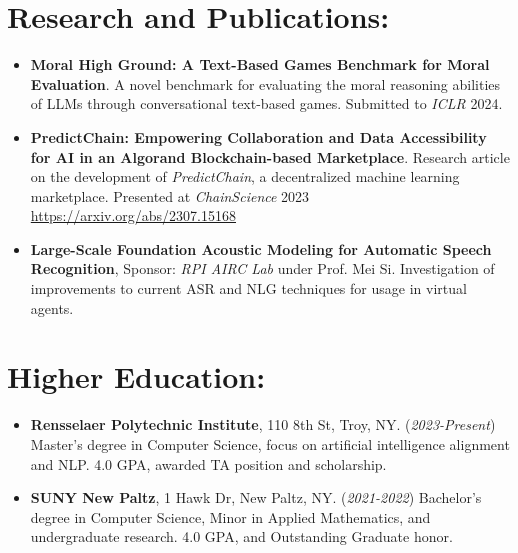 \documentclass[12pt]{article}
\begin{document}
\section*{Research and Publications:}
\begin{itemize}
    \itemsep0em
    
    \item \textbf{Moral High Ground: A Text-Based Games Benchmark for Moral Evaluation}.  A novel benchmark for evaluating the moral reasoning abilities of LLMs through conversational text-based games.  Submitted to \textit{ICLR} 2024.
    
    \item \textbf{PredictChain: Empowering Collaboration and Data Accessibility for AI in an Algorand Blockchain-based Marketplace}.  Research article on the development of \textit{PredictChain}, a decentralized machine learning marketplace.  Presented at \textit{ChainScience} 2023 \url{https://arxiv.org/abs/2307.15168}
    
    \item \textbf{Large-Scale Foundation Acoustic Modeling for Automatic Speech Recognition}, Sponsor: \textit{RPI AIRC Lab} under Prof. Mei Si. Investigation of improvements to current ASR and NLG techniques for usage in virtual agents.
    
\end{itemize}

\section*{Higher Education:}
\begin{itemize}
    \itemsep0em
    \item \textbf{Rensselaer Polytechnic Institute}, 110 8th St, Troy, NY. (\textit{2023-Present}) Master's degree in Computer Science, focus on artificial intelligence alignment and NLP.  4.0 GPA, awarded TA position and scholarship.
    \item \textbf{SUNY New Paltz}, 1 Hawk Dr, New Paltz, NY. (\textit{2021-2022}) Bachelor's degree in Computer Science, Minor in Applied Mathematics, and undergraduate research. 4.0 GPA, and Outstanding Graduate honor.
\end{itemize}
\end{document}
